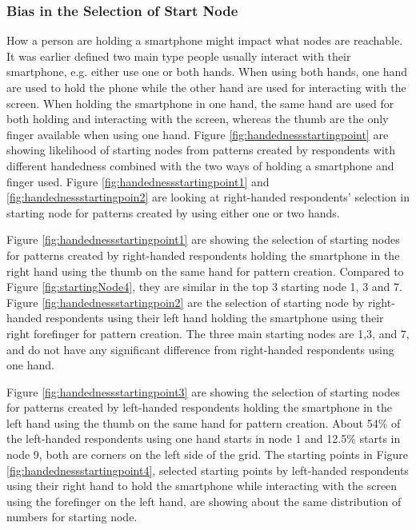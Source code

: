     \subsubsection{Bias in the Selection of Start Node}
      How a person are holding a smartphone might impact what nodes are reachable. It was earlier defined two main type people usually interact with their smartphone, e.g. either use one or both hands. When using both hands, one hand are used to hold the phone while the other hand are used for interacting with the screen. When holding the smartphone in one hand, the same hand are used for both holding and interacting with the screen, whereas the thumb are the only finger available when using one hand. Figure \ref{fig:handednessstartingpoint} are showing likelihood of starting nodes from patterns created by respondents with different handedness combined with the two ways of holding a smartphone and finger used. Figure \ref{fig:handednessstartingpoint1} and \ref{fig:handednessstartingpoin2} are looking at right-handed respondents' selection in starting node for patterns created by using either one or two hands. 

      Figure \ref{fig:handednessstartingpoint1} are showing the selection of starting nodes for patterns created by right-handed respondents holding the smartphone in the right hand using the thumb on the same hand for pattern creation. Compared to Figure \ref{fig:startingNode4}, they are similar in the top 3 starting node 1, 3 and 7. Figure \ref{fig:handednessstartingpoin2} are the selection of starting node by right-handed respondents using their left hand holding the smartphone using their right forefinger for pattern creation. The three main starting nodes are 1,3, and 7, and do not have any significant difference from right-handed respondents using one hand. 

      Figure \ref{fig:handednessstartingpoint3} are showing the selection of starting nodes for patterns created by left-handed respondents holding the smartphone in the left hand using the thumb on the same hand for pattern creation. About 54\% of the left-handed respondents using one hand starts in node 1 and 12.5\% starts in node 9, both are corners on the left side of the grid. The starting points in Figure \ref{fig:handednessstartingpoint4}, selected starting points by left-handed respondents using their right hand to hold the smartphone while interacting with the screen using the forefinger on the left hand, are showing about the same distribution of numbers for starting node.

